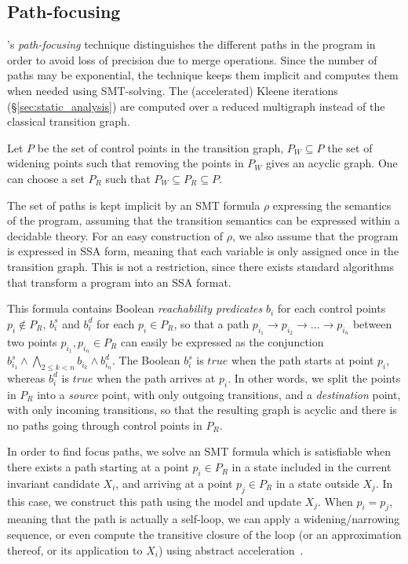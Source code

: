 \documentclass{llncs}
\begin{document}
\subsection{Path-focusing}
\label{sec:path_focusing}

\cite{Monniaux_Gonnord_SAS11}'s \emph{path-focusing} technique
distinguishes the different paths in the program in order to avoid loss of
precision due to merge operations. Since the number of paths may be exponential,
the technique keeps them implicit and computes them when needed using
SMT-solving.
The (accelerated) Kleene iterations (\S\ref{sec:static_analysis}) are computed over a reduced multigraph instead of the classical transition graph.

Let $P$ be the set of control points in the transition graph, 
$P_W \subseteq P$ the set of widening points
such that removing the points in $P_W$ gives an acyclic graph.
One can choose a set $P_R$ such that $P_W \subseteq P_R \subseteq P$.

The set of paths is kept implicit by an SMT formula $\rho$ expressing
the semantics of the program, assuming that the transition semantics can be
expressed within a decidable theory. For an easy construction of $\rho$, 
we also assume that the program is expressed in SSA form, meaning that each
variable is only assigned once in the transition graph. This is not a
restriction, since there exists standard algorithms that transform a program into
an SSA format.

This formula contains Boolean \emph{reachability predicates} $b_i$ for each
control points $p_i \notin P_R$, $b_i^s$ and $b_i^d$ for each $p_i \in P_R$, so
that a path 
$p_{i_1} \rightarrow p_{i_2} \rightarrow \dots \rightarrow p_{i_n}$ 
between two points $p_{i_1}, p_{i_n} \in P_R$ 
can easily be expressed as the
conjunction $b_{i_1}^s \wedge \bigwedge_{2 \leq k < n} b_{i_k} \wedge b_{i_n}^d$.
The Boolean $b_{i}^s$ is $true$ when the path starts at point $p_i$, whereas
$b_i^d$ is $true$ when the path arrives at $p_i$. In other words, we split the
points in $P_R$ into a \emph{source} point, with only outgoing transitions, and
a \emph{destination} point, with only incoming transitions, so that the
resulting graph is acyclic and there is no paths going through control
points in $P_R$.

In order to find focus paths, we solve an SMT formula which is satisfiable when
there exists a path starting at a point $p_i \in P_R$ in a state included in the
current invariant candidate $X_i$, and arriving at a point $p_j \in P_R$ in a
state outside $X_j$. In this case, we construct this path using the model and
update $X_j$. When $p_i = p_j$, meaning that the path is actually a self-loop,
we can apply a widening/narrowing sequence, or even compute the transitive
closure of the loop (or an approximation thereof, or its application to $X_i$)
using abstract acceleration~\cite{DBLP:conf/sas/GonnordH06}.
\end{document}
